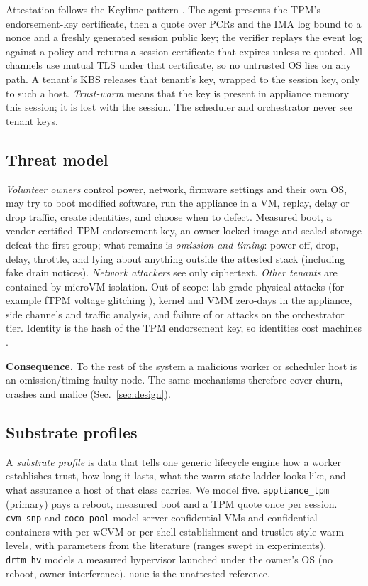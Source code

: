 Attestation follows the Keylime pattern \cite{schear2016keylime}. The agent presents the TPM's endorsement-key
certificate, then a quote over PCRs and the IMA log bound to a nonce and a freshly generated session public key; the
verifier replays the event log against a policy and returns a session certificate that expires unless re-quoted. All
channels use mutual TLS under that certificate, so no untrusted OS lies on any path. A tenant's KBS releases that tenant's
key, wrapped to the session key, only to such a host. \emph{Trust-warm} means that the key is present in appliance memory
this session; it is lost with the session. The scheduler and orchestrator never see tenant keys.

\subsection{Threat model}
\label{sec:threat}
\emph{Volunteer owners} control power, network, firmware settings and their own OS, may try to boot modified software,
run the appliance in a VM, replay, delay or drop traffic, create identities, and choose when to defect. Measured boot, a
vendor-certified TPM endorsement key, an owner-locked image and sealed storage defeat the first group; what remains is
\emph{omission and timing}: power off, drop, delay, throttle, and lying about anything outside the attested stack
(including fake drain notices). \emph{Network attackers} see only ciphertext. \emph{Other tenants} are contained by
microVM isolation. Out of scope: lab-grade physical attacks (for example fTPM voltage glitching \cite{jacob2023faultpm}),
kernel and VMM zero-days in the appliance, side channels and traffic analysis, and failure of or attacks on the
orchestrator tier. Identity is the hash of the TPM endorsement key, so identities cost machines \cite{douceur2002sybil}.

\textbf{Consequence.} To the rest of the system a malicious worker or scheduler host is an omission/timing-faulty node.
The same mechanisms therefore cover churn, crashes and malice (Sec.~\ref{sec:design}).

\subsection{Substrate profiles}
\label{sec:substrates}
A \emph{substrate profile} is data that tells one generic lifecycle engine how a worker establishes trust, how long it
lasts, what the warm-state ladder looks like, and what assurance a host of that class carries. We model five.
\texttt{appliance\_tpm} (primary) pays a reboot, measured boot and a TPM quote once per session. \texttt{cvm\_snp}
and \texttt{coco\_pool} model server confidential VMs and confidential containers with per-wCVM or per-shell establishment and
trustlet-style warm levels, with parameters from the literature (ranges swept in experiments). \texttt{drtm\_hv} models
a measured hypervisor launched under the owner's OS (no reboot, owner interference). \texttt{none} is the unattested reference.

